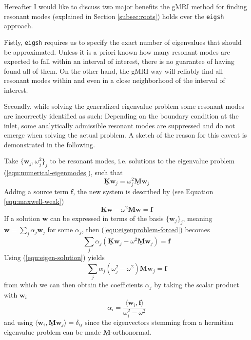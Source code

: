 \documentclass[11pt, a4paper]{article}
\begin{document}
Hereafter I would like to discuss two major benefits the \acrshort{gMRI} method
for finding resonant modes (explained in Section \ref{subsec:roots}) holds over
the \texttt{eigsh} approach.

Fistly, \texttt{eigsh} requires us to specify the exact number of eigenvalues that
should be approximated. Unless it is a priori known how many resonant modes are
expected to fall within an interval of interest, there is no guarantee of having
found all of them. On the other hand, the \acrshort{gMRI} way will reliably find
all resonant modes within and even in a close neighborhood of the interval of
interest.

Secondly, while solving the generalized eigenvalue problem some resonant modes
are incorrectly identified as such: Depending on the boundary condition at the
inlet, some analytically admissible resonant modes are suppressed and do not
emerge when solving the actual problem. A sketch of the reason for this caveat
is demonstrated in the following.

Take $\{ \mathbf{w}_j, \omega_j^2 \}_j$ to be resonant modes, i.e. solutions to 
the eigenvalue problem (\ref{equ:numerical-eigenmodes}), such that
\begin{equation}
    \mathbf{\underline{K}} \mathbf{w}_j = \omega_j^2 \mathbf{\underline{M}} \mathbf{w}_j
    \label{equ:eigen-solution}
\end{equation}
Adding a source term $\mathbf{f}$, the new system is described by (see Equation \ref{equ:maxwell-weak})
\begin{equation}
    \mathbf{\underline{K}} \mathbf{w} - \omega^2 \mathbf{\underline{M}} \mathbf{w} = \mathbf{f} \label{equ:eigenproblem-forced}
\end{equation}
If a solution $\mathbf{w}$ can be expressed in terms of the basis $\{ \mathbf{w}_j \}_j$,
meaning $\mathbf{w} = \sum_j \alpha_j \mathbf{w}_j$ for some $\alpha_j$, then
(\ref{equ:eigenproblem-forced}) becomes
\begin{equation} 
    \sum_j \alpha_j (\mathbf{\underline{K}} \mathbf{w}_j - \omega^2 \mathbf{\underline{M}} \mathbf{w}_j) = \mathbf{f}
\end{equation}
Using (\ref{equ:eigen-solution}) yields
\begin{equation}
    \sum_j \alpha_j (\omega_j^2 - \omega^2) \mathbf{\underline{M}} \mathbf{w}_j = \mathbf{f}
\end{equation}
from which we can then obtain the coefficients $\alpha_j$ by taking the scalar product
with $\mathbf{w}_i$
\begin{equation}
    \alpha_i = \frac{\langle \mathbf{w}_i, \mathbf{f} \rangle}{\omega_i^2 - \omega^2} \label{equ:suppression}
\end{equation}
and using $\langle \mathbf{w}_i, \mathbf{\underline{M}} \mathbf{w}_j \rangle = \delta_{ij}$
since the eigenvectors stemming from a hermitian eigenvalue problem can be made 
$\mathbf{\underline{M}}$-orthonormal.
\end{document}
